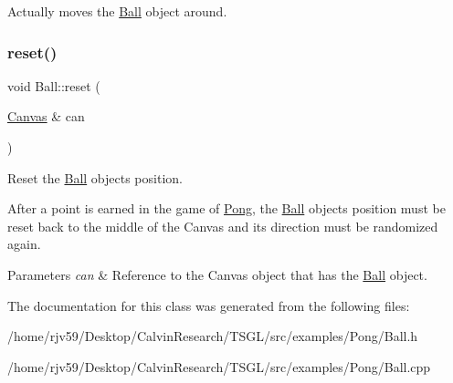 Actually moves the \hyperlink{class_ball}{Ball} object around. \mbox{\label{class_ball_a12dad22dfdba8e2b92ae74464001d55f}} 
\subsubsection{\texorpdfstring{reset()}{reset()}}
{\footnotesize\ttfamily void Ball\+::reset (\begin{DoxyParamCaption}\item[{\hyperlink{classtsgl_1_1_canvas}{Canvas} \&}]{can }\end{DoxyParamCaption})}



Reset the \hyperlink{class_ball}{Ball} object\textquotesingle{}s position. 

After a point is earned in the game of \hyperlink{class_pong}{Pong}, the \hyperlink{class_ball}{Ball} object\textquotesingle{}s position must be reset back to the middle of the Canvas and its direction must be randomized again. 
\begin{DoxyParams}{Parameters}
{\em can} & Reference to the Canvas object that has the \hyperlink{class_ball}{Ball} object. \\
\hline
\end{DoxyParams}


The documentation for this class was generated from the following files\+:\begin{DoxyCompactItemize}
\item 
/home/rjv59/\+Desktop/\+Calvin\+Research/\+T\+S\+G\+L/src/examples/\+Pong/Ball.\+h\item 
/home/rjv59/\+Desktop/\+Calvin\+Research/\+T\+S\+G\+L/src/examples/\+Pong/Ball.\+cpp\end{DoxyCompactItemize}

